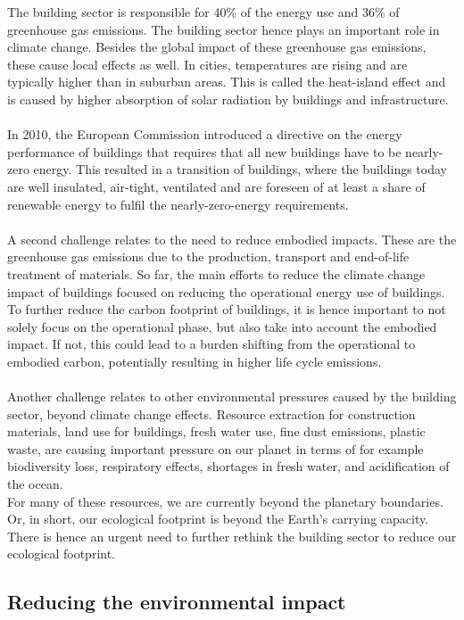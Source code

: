 \documentclass[../summary.tex]{subfiles}
\begin{document}
	The building sector is responsible for 40\% of the energy use and 36\% of greenhouse gas emissions. The building sector hence plays an important role in climate change. Besides the global impact of these greenhouse gas emissions, these cause local effects as well. In cities, temperatures are rising and are typically higher than in suburban areas. This is called the heat-island effect and is caused by higher absorption of solar radiation by buildings and infrastructure.
	\\\\
	In 2010, the European Commission introduced a directive on the energy performance of buildings that requires that all new buildings have to be nearly-zero energy. This resulted in a transition of buildings, where the buildings today are well insulated, air-tight, ventilated and are foreseen of at least a share of renewable energy to fulfil the nearly-zero-energy requirements.
	\\\\
	A second challenge relates to the need to reduce embodied impacts. These are the greenhouse gas emissions due to the production, transport and end-of-life treatment of materials. So far, the main efforts to reduce the climate change impact of buildings focused on reducing the operational energy use of buildings. To further reduce the carbon footprint of buildings, it is hence important to not solely focus on the operational phase, but also take into account the embodied impact. If not, this could lead to a burden shifting from the operational to embodied carbon, potentially resulting in higher life cycle emissions.
	\\\\
	Another challenge relates to other environmental pressures caused by the building sector, beyond climate change effects. Resource extraction for construction materials, land use for buildings, fresh water use, fine dust emissions, plastic waste, are causing important pressure on our planet in terms of for example biodiversity loss, respiratory effects, shortages in fresh water, and acidification of the ocean. 
	\\
	For many of these resources, we are currently beyond the planetary boundaries. Or, in short, our ecological footprint is beyond the Earth’s carrying capacity. There is hence an urgent need to further rethink the building sector to reduce our ecological footprint. 
	
	\subsection{Reducing the environmental impact}
	
\end{document}
